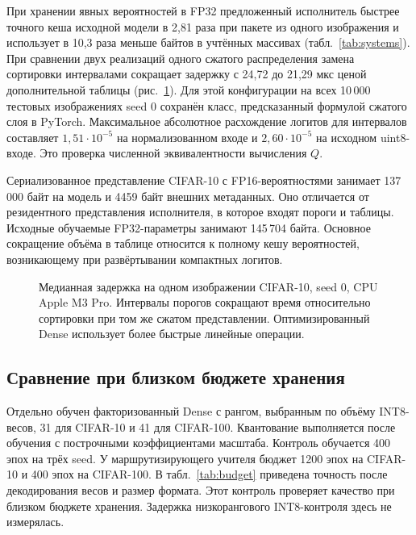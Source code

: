 \documentclass[11pt,a4paper]{article}
\begin{document}
При хранении явных вероятностей в FP32 предложенный исполнитель быстрее точного кеша исходной модели в 2,81 раза при пакете из одного изображения и использует в 10,3 раза меньше байтов в учтённых массивах (табл.~\ref{tab:systems}). При сравнении двух реализаций одного сжатого распределения замена сортировки интервалами сокращает задержку с 24,72 до 21,29 мкс ценой дополнительной таблицы (рис.~\ref{fig:latency}). Для этой конфигурации на всех 10\,000 тестовых изображениях seed 0 сохранён класс, предсказанный формулой сжатого слоя в PyTorch. Максимальное абсолютное расхождение логитов для интервалов составляет $1{,}51\cdot10^{-5}$ на нормализованном входе и $2{,}60\cdot10^{-5}$ на исходном uint8-входе. Это проверка численной эквивалентности вычисления $Q$.

Сериализованное представление CIFAR-10 с FP16-вероятностями занимает 137\,000 байт на модель и 4459 байт внешних метаданных. Оно отличается от резидентного представления исполнителя, в которое входят пороги и таблицы. Исходные обучаемые FP32-параметры занимают 145\,704 байта. Основное сокращение объёма в таблице относится к полному кешу вероятностей, возникающему при развёртывании компактных логитов.


\begin{figure}[htbp]
\centering
{}
\caption{Медианная задержка на одном изображении CIFAR-10, seed 0, CPU Apple M3 Pro. Интервалы порогов сокращают время относительно сортировки при том же сжатом представлении. Оптимизированный Dense использует более быстрые линейные операции.}
\label{fig:latency}
\end{figure}

\subsection{Сравнение при близком бюджете хранения}
Отдельно обучен факторизованный Dense с рангом, выбранным по объёму INT8-весов, 31 для CIFAR-10 и 41 для CIFAR-100. Квантование выполняется после обучения с построчными коэффициентами масштаба. Контроль обучается 400 эпох на трёх seed. У маршрутизирующего учителя бюджет 1200 эпох на CIFAR-10 и 400 эпох на CIFAR-100. В табл.~\ref{tab:budget} приведена точность после декодирования весов и размер формата. Этот контроль проверяет качество при близком бюджете хранения. Задержка низкорангового INT8-контроля здесь не измерялась.
\end{document}
